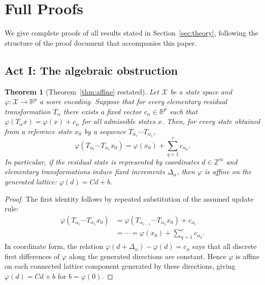 \documentclass[11pt]{article}
\theoremstyle{plain}
\newtheorem{theorem}{Theorem}[section]
\theoremstyle{remark}
\begin{document}
\appendix

\section{Full Proofs}
\label{app:proofs}

We give complete proofs of all results stated in Section~\ref{sec:theory}, following
the structure of the proof document that accompanies this paper.

\subsection*{Act I: The algebraic obstruction}

\begin{theorem}[Theorem~\ref{thm:affine} restated]
  Let $\mathcal{X}$ be a state space and $\varphi:\mathcal{X}\to\mathbb{R}^p$ a
  score encoding. Suppose that for every elementary residual transformation
  $T_\alpha$ there exists a fixed vector $c_\alpha\in\mathbb{R}^p$ such that
  $\varphi(T_\alpha x)=\varphi(x)+c_\alpha$ for all admissible states $x$. Then,
  for every state obtained from a reference state $x_0$ by a sequence
  $T_{\alpha_r}\cdots T_{\alpha_1}$,
  \[
    \varphi(T_{\alpha_r}\cdots T_{\alpha_1}x_0)
    =
    \varphi(x_0)+\sum_{q=1}^r c_{\alpha_q}.
  \]
  In particular, if the residual state is represented by coordinates
  $d\in\mathbb{Z}^m$ and elementary transformations induce fixed increments
  $\Delta_\alpha$, then $\varphi$ is affine on the generated lattice:
  $\varphi(d)=Cd+b$.
\end{theorem}
\begin{proof}
  The first identity follows by repeated substitution of the assumed update rule:
  \begin{align*}
    \varphi(T_{\alpha_r}\cdots T_{\alpha_1}x_0)
    &= \varphi(T_{\alpha_{r-1}}\cdots T_{\alpha_1}x_0) + c_{\alpha_r} \\
    &= \cdots = \varphi(x_0) + \sum_{q=1}^r c_{\alpha_q}.
  \end{align*}
  In coordinate form, the relation $\varphi(d+\Delta_\alpha)-\varphi(d)=c_\alpha$
  says that all discrete first differences of $\varphi$ along the generated
  directions are constant. Hence $\varphi$ is affine on each connected lattice
  component generated by these directions, giving $\varphi(d) = Cd + b$ for
  $b = \varphi(0)$.
\end{proof}
\end{document}

